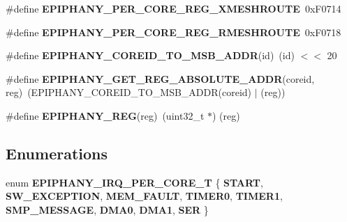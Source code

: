 \begin{DoxyCompactItemize}
\#define {\bfseries E\+P\+I\+P\+H\+A\+N\+Y\+\_\+\+P\+E\+R\+\_\+\+C\+O\+R\+E\+\_\+\+R\+E\+G\+\_\+\+X\+M\+E\+S\+H\+R\+O\+U\+TE}~0x\+F0714
\item 
\mbox{\label{epiphany-utility_8h_aad1814d6201cdc3f9935ab505fb8d538}} 
\#define {\bfseries E\+P\+I\+P\+H\+A\+N\+Y\+\_\+\+P\+E\+R\+\_\+\+C\+O\+R\+E\+\_\+\+R\+E\+G\+\_\+\+R\+M\+E\+S\+H\+R\+O\+U\+TE}~0x\+F0718
\item 
\mbox{\label{epiphany-utility_8h_a6c3a6b4db691517cb206435618f3843e}} 
\#define {\bfseries E\+P\+I\+P\+H\+A\+N\+Y\+\_\+\+C\+O\+R\+E\+I\+D\+\_\+\+T\+O\+\_\+\+M\+S\+B\+\_\+\+A\+D\+DR}(id)~(id) $<$$<$ 20
\item 
\mbox{\label{epiphany-utility_8h_a8967dc6a24a93a670e070c458974a69f}} 
\#define {\bfseries E\+P\+I\+P\+H\+A\+N\+Y\+\_\+\+G\+E\+T\+\_\+\+R\+E\+G\+\_\+\+A\+B\+S\+O\+L\+U\+T\+E\+\_\+\+A\+D\+DR}(coreid,  reg)~(E\+P\+I\+P\+H\+A\+N\+Y\+\_\+\+C\+O\+R\+E\+I\+D\+\_\+\+T\+O\+\_\+\+M\+S\+B\+\_\+\+A\+D\+DR(coreid) $\vert$ (reg))
\item 
\mbox{\label{epiphany-utility_8h_a884fb387dcbf6c09d46643e102898a32}} 
\#define {\bfseries E\+P\+I\+P\+H\+A\+N\+Y\+\_\+\+R\+EG}(reg)~(uint32\+\_\+t $\ast$) (reg)
\end{DoxyCompactItemize}
\subsection*{Enumerations}
\begin{DoxyCompactItemize}
\item 
\mbox{\label{epiphany-utility_8h_a82144582b8eebbaa2eea748aeff0cb31}} 
enum {\bfseries E\+P\+I\+P\+H\+A\+N\+Y\+\_\+\+I\+R\+Q\+\_\+\+P\+E\+R\+\_\+\+C\+O\+R\+E\+\_\+T} \{ \newline
{\bfseries S\+T\+A\+RT}, 
{\bfseries S\+W\+\_\+\+E\+X\+C\+E\+P\+T\+I\+ON}, 
{\bfseries M\+E\+M\+\_\+\+F\+A\+U\+LT}, 
{\bfseries T\+I\+M\+E\+R0}, 
\newline
{\bfseries T\+I\+M\+E\+R1}, 
{\bfseries S\+M\+P\+\_\+\+M\+E\+S\+S\+A\+GE}, 
{\bfseries D\+M\+A0}, 
{\bfseries D\+M\+A1}, 
\newline
{\bfseries S\+ER}
 \}
\end{DoxyCompactItemize}
